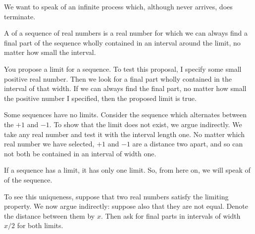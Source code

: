 
\sbasic


























\sstart
{}


We want to speak of an
infinite process which,
although never arrives,
does terminate.


A
of a sequence of real
numbers is a real number
for which we can always
find a final part of the
sequence wholly contained
in an interval around the limit,
no matter how small the interval.

You propose a limit
for a sequence.
To test this proposal,
I specify some small
positive real number.
Then we look for a
final part wholly contained
in the interval of that
width.
If we can always find the
final part, no matter
how small the positive
number I specified,
then the proposed limit
is true.


Some sequences have no
limits.
Consider the sequence
which alternates between
the $+1$
and $-1$.
To show that the limit
does not exist, we
argue indirectly.
We take any real
number and test it
with the interval length
one.
No matter which
real number we have
selected,
$+1$ and
$-1$ are a
distance two apart,
and so can not
both be contained
in an interval
of width one.


If a sequence has a limit,
it has only one limit.
So, from here on, we will speak
of  of
the sequence.

To see this uniqueness,
suppose that two
real numbers satisfy the
limiting property.
We now argue indirectly:
suppose also that they are
not equal.
Denote the distance between
them by $x$.
Then ask for final parts
in intervals of width $x/2$
for both limits.

